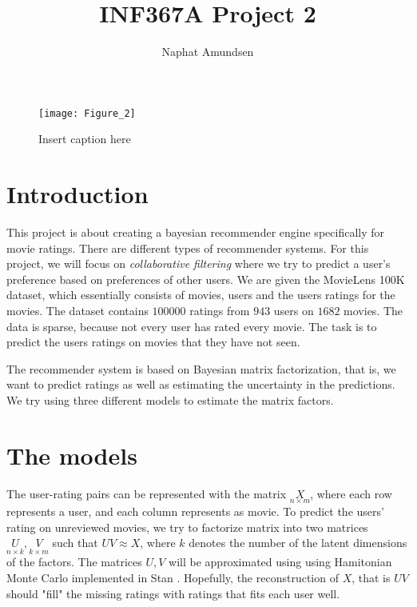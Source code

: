\documentclass[12pt]{article}
\begin{document}
\title{\textbf{INF367A Project 2}}
\author{Naphat Amundsen}
\maketitle
\sectionfont{\fontsize{14}{15}\selectfont}
\subsectionfont{\fontsize{12}{15}\selectfont}
\subsubsectionfont{\fontsize{12}{15}\selectfont}
\graphicspath{ {./images/} }

\ifx
\begin{figure}[H]
	\centering
	\texttt{[image: Figure\_2]}
	\caption{Insert caption here}
\end{figure}
\fi

\newcommand{\opGamma}{\operatorname{Gamma}}
\newcommand{\Um}{\underset{n \times k}{U}}
\newcommand{\Vm}{\underset{k \times m}{V}}
\newcommand{\Xm}{\underset{n \times m}{X}}
\newcommand{\neff}{N_{\text{eff}}}
\newcommand{\rhat}{\hat{R}}

\section*{Introduction}
    This project is about creating a bayesian recommender engine specifically for movie ratings. There are different types of recommender systems. For this project, we will focus on \textit{collaborative filtering} where we try to predict a user's preference based on preferences of other users. We are given the MovieLens 100K dataset, which essentially consists of movies, users and the users ratings for the movies. The dataset contains $100 000$ ratings from $943$ users on $1682$ movies. The data is sparse, because not every user has rated every movie. The task is to predict the users ratings on movies that they have not seen. 

    The recommender system is based on Bayesian matrix factorization, that is, we want to predict ratings as well as estimating the uncertainty in the predictions. We try using three different models to estimate the matrix factors.

\section{The models}
    The user-rating pairs can be represented with the matrix $\Xm$, where each row represents a user, and each column represents as movie. To predict the users' rating on unreviewed movies, we try to factorize matrix into two matrices $\Um, \Vm$ such that $UV \approx X$, where $k$ denotes the number of the latent dimensions of the factors. The matrices $U,V$ will be approximated using using Hamitonian Monte Carlo implemented in Stan \cite{HMC}. Hopefully, the reconstruction of $X$, that is $UV$ should "fill" the missing ratings with ratings that fits each user well.
\end{document}
